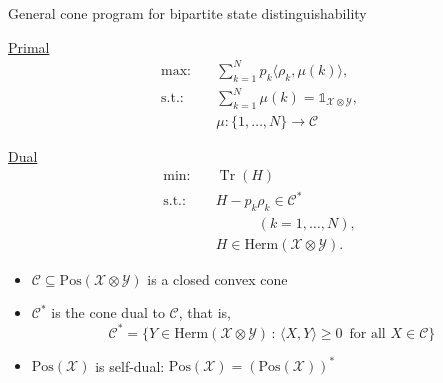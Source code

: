 \documentclass{beamer}
\def\I{\mathds{1}}
\newcommand{\ip}[2]{\langle #1 , #2\rangle}
\newcommand{\tr}{\operatorname{Tr}}
\def\X{\mathcal{X}}
\def\Y{\mathcal{Y}}
\def\C{\mathcal{C}}
\newcommand{\setft}[1]{\mathrm{#1}}
\newcommand{\Pos}{\setft{Pos}}
\newcommand{\Herm}{\setft{Herm}}
\begin{document}
    \begin{frame}{General cone program for bipartite state distinguishability}
        \begin{minipage}[t]{0.48\linewidth}
            \begin{center}
            \underline{Primal}
            \vspace{-5pt}
            \begin{equation*}
              \begin{split}
                \text{max:} \quad & 
                \sum_{k=1}^{N} p_{k}\ip{\rho_{k}}{\mu(k)},\\
                \text{s.t.:} \quad & \sum_{k=1}^{N} \mu(k) = \I_{\X\otimes\Y},\\
                  & \boxed{\mu : \{1,\ldots, N\}\rightarrow \C}
              \end{split}
            \end{equation*}
            \end{center}
        \end{minipage}\hfill
        \begin{minipage}[t]{0.48\linewidth}
            \begin{center}
            \underline{Dual}
            \vspace{5pt}
            \begin{equation*}
              \begin{split}
                \text{min:} \quad & \tr(H)\\
                \text{s.t.:} \quad & \boxed{H-p_k\rho_k \in \C^{\ast}}\\
                & \quad\qquad(k = 1,\ldots,N),\\
                \quad & H \in \Herm(\X\otimes\Y).
              \end{split}
            \end{equation*}
            \end{center}
        \end{minipage}
        \vspace{20pt}
        \begin{itemize}
            \item $\C\subseteq\Pos(\X\otimes\Y)$ is a closed convex cone
            \item $\C^{\ast}$ is the cone dual to $\C$, that is,
            \[
              \C^{\ast} = \{Y\in\Herm(\X\otimes\Y)\,:\,\ip{X}{Y} \geq 0\;\:\text{for all $X\in\C$}\}
            \]
            \item $\Pos(\X)$ is self-dual: $\Pos(\X) = (\Pos(\X))^{\ast}$
        \end{itemize}
    \end{frame}
\end{document}
